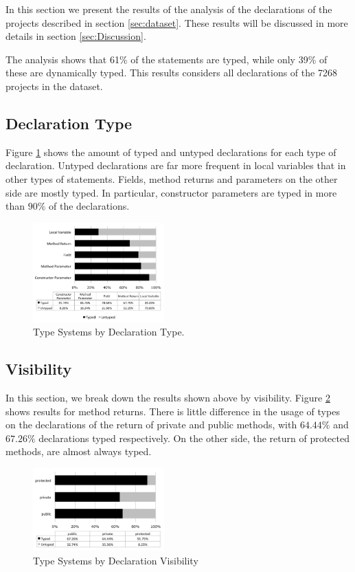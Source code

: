 \documentclass[preprint]{sigplanconf}
\begin{document}
In this section we present the results of the analysis of the declarations of the projects described in section \ref{sec:dataset}. 
These results will be discussed in more details in section \ref{sec:Discussion}.

The analysis shows that 61\% of the statements are typed, while only 39\% of these are dynamically typed. This results considers all declarations of the 7268 projects in the dataset.

\subsection{Declaration Type\label{sub:declaration-type-results}}
Figure \ref{fig:tipo_declaracao} shows the amount of typed and untyped declarations for each type of declaration. 
Untyped declarations are far more frequent in local variables that in other types of statements.
Fields, method returns and parameters on the other side are mostly typed. In particular, constructor parameters are typed in more than $90\%$ of the declarations.

\begin{figure}[ht]
\centering 
\includegraphics[width=0.45\textwidth]{images/type} 
\caption{Type Systems by Declaration Type.}
\label{fig:tipo_declaracao} 
\end{figure}

\subsection{Visibility\label{sub:visibility-results}}
In this section, we break down the results shown above by visibility. 
Figure \ref{fig:method_return_visibility} shows results for method returns.
There is little difference in the usage of types on the declarations of the return of private and public methods, with $64.44\%$ and $67.26\%$ declarations typed respectively.
On the other side, the return of protected methods, are almost always typed.

\begin{figure}[ht]
\centering \includegraphics[width=0.45\textwidth]{images/method_return_visibility} 
\caption{Type Systems by Declaration Visibility}
\label{fig:method_return_visibility} 
\end{figure}
\end{document}
